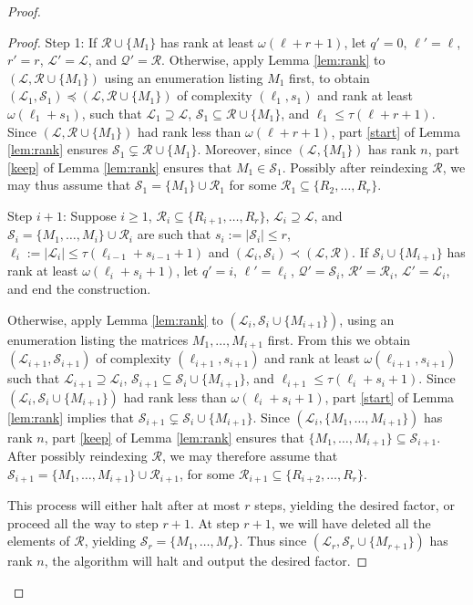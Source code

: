 \documentclass[12pt,oneside,british,a4wide]{amsart}
\numberwithin{equation}{section}
\theoremstyle{definition}
\newcommand{\calL}{\mathcal{L}}
\newcommand{\calQ}{\mathcal{Q}}
\newcommand{\calR}{\mathcal{R}}
\newcommand{\calS}{\mathcal{S}}
\begin{document}
\begin{proof}
\begin{proof}
Step 1: If $\calR\cup \{M_1\}$ has rank at least $\omega(\ell+r+1)$, let $q'=0$, $\ell'=\ell$, $r'=r$, $\calL'=\calL$, and $\calQ'=\calR$.  Otherwise, apply Lemma \ref{lem:rank} to $(\calL,\calR\cup \{M_1\})$ using an enumeration listing $M_1$ first, to obtain $(\calL_1,\calS_1)\preceq (\calL,\calR\cup\{M_1\})$ of complexity $(\ell_1,s_1)$ and rank at least $\omega(\ell_1+s_1)$, such that $\calL_1\supseteq \calL$, $\calS_1 \subseteq \calR\cup \{M_1\}$, and $\ell_1\leq \tau(\ell+r+1)$.  Since $(\calL,\calR\cup \{M_1\})$ had rank less than $\omega(\ell+r+1)$, part \ref{start} of Lemma \ref{lem:rank} ensures $\calS_1\subsetneq \calR\cup \{M_1\}$.  Moreover, since $(\calL,\{M_1\})$ has rank $n$, part \ref{keep} of Lemma \ref{lem:rank} ensures that $M_1\in \calS_1$.  Possibly after reindexing $\calR$, we may thus assume that $\calS_1=\{M_1\}\cup \calR_1$ for some $\calR_1\subseteq \{R_2,\ldots, R_r\}$.   

Step $i+1$:  Suppose $i\geq 1$, $\calR_i\subseteq \{R_{i+1},\ldots, R_{r}\}$,  $\calL_i\supseteq \calL$, and $\calS_i=\{M_1,\ldots, M_{i}\}\cup \calR_i$  are such that $s_i:=|\calS_i|\leq r$, $\ell_i:=|\calL_i|\leq \tau(\ell_{i-1}+s_{i-1}+1)$ and $(\calL_i,\calS_i)\prec (\calL,\calR)$. If $\calS_i\cup \{M_{i+1}\}$ has rank at least $\omega(\ell_i+s_i+1)$, let $q'=i$, $\ell'=\ell_i$, $\calQ'=\calS_i$, $\calR'=\calR_i$, $\calL'=\calL_i$, and end the construction. 

Otherwise, apply Lemma \ref{lem:rank} to $(\calL_i,\calS_i\cup \{M_{i+1}\})$, using an enumeration listing the matrices $M_1,\ldots, M_{i+1}$ first.  From this we obtain $(\calL_{i+1},\calS_{i+1})$ of complexity $(\ell_{i+1},s_{i+1})$ and rank at least $\omega(\ell_{i+1},s_{i+1})$ such that $\calL_{i+1}\supseteq \calL_i$, $\calS_{i+1}\subseteq  \calS_i\cup \{M_{i+1}\}$, and $\ell_{i+1} \leq \tau(\ell_i + s_i+1)$.  Since $(\calL_i,\calS_i\cup \{M_{i+1}\})$ had rank less than $\omega(\ell_i+s_i+1)$, part \ref{start} of Lemma \ref{lem:rank} implies that $\calS_{i+1}\subsetneq \calS_i\cup \{M_{i+1}\}$.  Since $(\calL_i,\{M_1,\ldots, M_{i+1}\})$ has rank $n$, part \ref{keep} of Lemma \ref{lem:rank} ensures that $\{M_1,\ldots, M_{i+1}\}\subseteq \calS_{i+1}$.  After possibly reindexing $\calR$, we may therefore assume that $\calS_{i+1}=\{M_1,\ldots, M_{i+1}\}\cup \calR_{i+1}$, for some $\calR_{i+1}\subseteq \{ R_{i+2},\ldots, R_r\}$.

This process will either halt after at most $r$ steps, yielding the desired factor, or proceed all the way to step $r+1$. At step $r+1$, we will have deleted all the elements of $\calR$, yielding $\calS_r=\{M_1,\ldots, M_r\}$. Thus since $(\calL_r,\calS_r\cup \{M_{r+1}\})$ has rank $n$, the algorithm will halt and output the desired factor.   
 \end{proof}


\end{proof}
\end{document}
